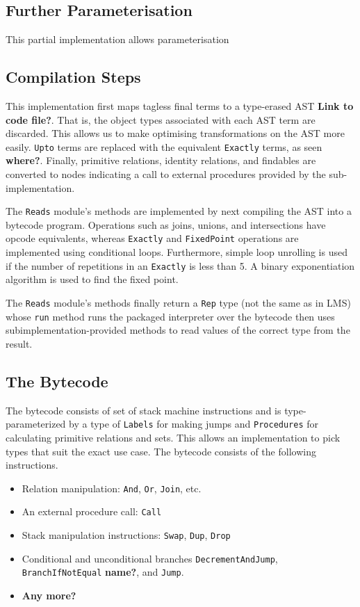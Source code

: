 \documentclass{report}
\newcommand \2[0]{\textbf{2}}
\newcommand \3[0]{\textbf{3}}
\newcommand{\todo}[1]{\textbf{#1}}
\begin{document}
\subsection{Further Parameterisation}
This partial implementation allows parameterisation

\subsection{Compilation Steps}
This implementation first maps tagless final terms to a type-erased AST \todo{Link to code file?}. That is, the object types associated with each AST term are discarded. This allows us to make optimising transformations on the AST more easily. \texttt{Upto} terms are replaced with the equivalent \texttt{Exactly} terms, as seen \todo{where?}. Finally, primitive relations, identity relations, and findables are converted to nodes indicating a call to external procedures provided by the sub-implementation.

The \texttt{Reads} module's methods are implemented by next compiling the AST into a bytecode program. Operations such as joins, unions, and intersections have opcode equivalents, whereas \texttt{Exactly} and \texttt{FixedPoint} operations are implemented using conditional loops. Furthermore, simple loop unrolling is used if the number of repetitions in an \texttt{Exactly} is less than 5. A binary exponentiation algorithm is used to find the fixed point.

The \texttt{Reads} module's methods finally return a \texttt{Rep} type (not the same as in LMS) whose \texttt{run} method runs the packaged interpreter over the bytecode then uses subimplementation-provided methods to read values of the correct type from the result.


\subsection{The Bytecode}
The bytecode consists of set of stack machine instructions and is type-parameterized by a type of \texttt{Labels} for making jumps and \texttt{Procedures} for calculating primitive relations and sets. This allows an implementation to pick types that suit the exact use case. The bytecode consists of the following instructions.

\begin{itemize}
    \item Relation manipulation: \texttt{And}, \texttt{Or}, \texttt{Join}, etc.
    \item An external procedure call: \texttt{Call}
    \item Stack manipulation instructions: \texttt{Swap}, \texttt{Dup}, \texttt{Drop}
    \item Conditional and unconditional branches \texttt{DecrementAndJump}, \texttt{BranchIfNotEqual} \todo{name?}, and \texttt{Jump}.
    \item \todo{Any more?}
\end{itemize}
\end{document}
